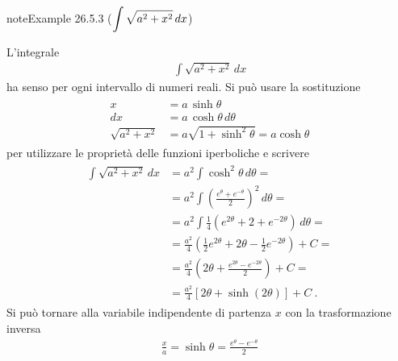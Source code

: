 \documentclass[letterpaper,10pt,italian]{jupyterBook}
\begin{document}
\begin{sphinxadmonition}{note}{Example 26.5.3 (\protect\( \displaystyle \int \sqrt{a^2 + x^2} \,  dx\protect\))}



\sphinxAtStartPar
L’integrale
\begin{equation*}
\begin{split}\int \sqrt{a^2 + x^2} \,  dx\end{split}
\end{equation*}
\sphinxAtStartPar
ha senso per ogni intervallo di numeri reali. Si può usare la sostituzione
\begin{equation*}
\begin{split}\begin{aligned}
   x & = a \, \sinh \theta \\
  dx & = a \, \cosh \theta \, d \theta \\
  \sqrt{a^2 + x^2} & = a \sqrt{1 + \sinh^2 \theta} = a \cosh \theta
\end{aligned}\end{split}
\end{equation*}
\sphinxAtStartPar
per utilizzare le proprietà delle funzioni iperboliche e scrivere
\begin{equation*}
\begin{split}\begin{aligned}
  \int \sqrt{a^2 + x^2} \, dx
   & = a^2 \int \cosh^2 \theta \, d \theta = \\
   & = a^2 \int \left( \frac{e^\theta + e^{-\theta}}{2} \right)^2 \, d \theta = \\
   & = a^2 \int \frac{1}{4} \left( e^{2 \theta} + 2 + e^{-2 \theta} \right) \, d \theta = \\
   & = \frac{a^2}{4} \left( \frac{1}{2} e^{2 \theta} + 2 \theta - \frac{1}{2} e^{-2 \theta} \right) + C = \\
   & = \frac{a^2}{4} \left( 2 \theta + \frac{e^{2 \theta} - e^{-2 \theta}}{2} \right) + C = \\
   & = \frac{a^2}{4} \left[ 2 \theta + \sinh \left( 2 \theta \right) \right] + C \ .
\end{aligned}\end{split}
\end{equation*}
\sphinxAtStartPar
Si può tornare alla variabile indipendente di partenza \(x\) con la trasformazione inversa
\begin{equation*}
\begin{split}\frac{x}{a} = \sinh \theta = \frac{e^{\theta} - e^{-\theta}}{2}\end{split}

\end{equation*}
\end{sphinxadmonition}
\end{document}
